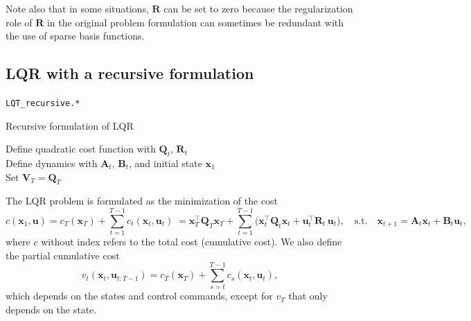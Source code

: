 \documentclass[10pt,a4paper]{article} %
\newcommand{\trsp}{{\scriptscriptstyle\top}}
\newcommand{\filename}[1]{\colorbox{rr2}{\color{white}\texttt{#1}}}
\begin{document}
Note also that in some situations, $\bm{R}$ can be set to zero because the regularization role of $\bm{R}$ in the original problem formulation can sometimes be redundant with the use of sparse basis functions.


\subsection{LQR with a recursive formulation}\label{sec:LQRrecursive}
\begin{flushright}
\filename{LQT\_recursive.*}
\end{flushright}

\begin{algorithm}
\caption{Recursive formulation of LQR}
\label{alg:LQRrecursive}
Define quadratic cost function with $\bm{Q}_t$, $\bm{R}_t$ \\ 
Define dynamics with $\bm{A}_t$, $\bm{B}_t$, and initial state $\bm{x}_1$ \\
Set $\bm{V}_T=\bm{Q}_T$ \\
\end{algorithm}

The LQR problem is formulated as the minimization of the cost
\begin{equation}
	c(\bm{x}_1,\bm{u}) = c_T(\bm{x}_T) + \sum_{t=1}^{T-1} c_t(\bm{x}_t,\bm{u}_t) 
	\;= \bm{x}_T^\trsp \bm{Q}_T \bm{x}_T + 
	\sum_{t=1}^{T-1} \Big(\bm{x}_t^\trsp \bm{Q}_t \bm{x}_t +
	\bm{u}_t^\trsp \bm{R}_t \, \bm{u}_t \Big), 
	\quad\text{s.t.}\quad 
	\bm{x}_{t+1} = \bm{A}_t \bm{x}_{t} + \bm{B}_t \bm{u}_{t},
\label{eq:cLQR}
\end{equation}
where $c$ without index refers to the total cost (cumulative cost). 
We also define the partial cumulative cost 
\begin{equation}
	v_t(\bm{x}_t,\bm{u}_{t:T-1}) = c_T(\bm{x}_T) + \sum_{s=t}^{T-1} c_s(\bm{x}_t,\bm{u}_t),
	\label{eq:cumulativeCost}
\end{equation}
which depends on the states and control commands, except for $v_T$ that only depends on the state. 
\end{document}
